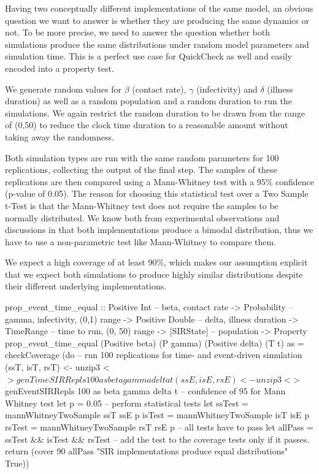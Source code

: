 Having two conceptually different implementations of the same model, an obvious question we want to answer is whether they are producing the same dynamics or not. To be more precise, we need to answer the question whether both simulations produce the same distributions under random model parameters and simulation time. This is a perfect use case for QuickCheck as well and easily encoded into a property test.

We generate random values for $\beta$ (contact rate), $\gamma$ (infectivity) and $\delta$ (illness duration) as well as a random population and a random duration to run the simulations. We again restrict the random duration to be drawn from the range of (0,50) to reduce the clock time duration to a reasonable amount without taking away the randomness.

Both simulation types are run with the same random parameters for 100 replications, collecting the output of the final step. The samples of these replications are then compared using a Mann-Whitney test with a 95\% confidence (p-value of 0.05). The reason for choosing this statistical test over a Two Sample t-Test is that the Mann-Whitney test does not require the samples to be normally distributed. We know both from experimental observations and discussions in \cite{macal_agent-based_2010} that both implementations produce a bimodal distribution, thus we have to use a non-parametric test like Mann-Whitney to compare them.


We expect a high coverage of at least 90\%, which makes our assumption explicit that we expect both simulations to produce highly similar distributions despite their different underlying implementations.

\begin{HaskellCode}
prop_event_time_equal :: Positive Int    -- beta, contact rate
                      -> Probability     -- gamma, infectivity, (0,1) range
                      -> Positive Double -- delta, illness duration
                      -> TimeRange       -- time to run, (0, 50) range
                      -> [SIRState]      -- population 
                      -> Property
prop_event_time_equal
    (Positive beta) (P gamma) (Positive delta) (T t) as = checkCoverage (do
  -- run 100 replications for time- and event-driven simulation
  (ssT, isT, rsT) <- unzip3 <$> genTimeSIRRepls 100 as beta gamma delta t
  (ssE, isE, rsE) <- unzip3 <$> genEventSIRRepls 100 as beta gamma delta t
  -- confidence of 95 for Mann Whitney test
  let p = 0.05
  -- perform statistical tests
  let ssTest = mannWhitneyTwoSample ssT ssE p
      isTest = mannWhitneyTwoSample isT isE p
      rsTest = mannWhitneyTwoSample rsT rsE p
  -- all tests have to pass
  let allPass = ssTest && isTest && rsTest 
  -- add the test to the coverage tests only if it passes.
  return 
    (cover 90 allPass "SIR implementations produce equal distributions" True))
\end{HaskellCode}

